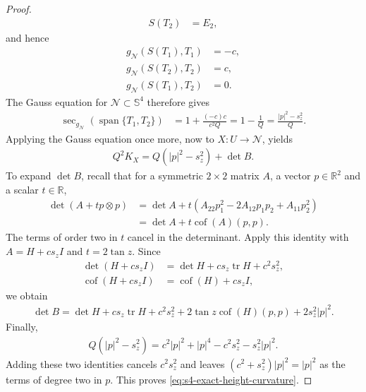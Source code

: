 \documentclass[a4paper,11pt,oneside,reqno]{amsart}
\numberwithin{equation}{section}
\theoremstyle{definition}
\begin{document}
\begin{proof}
\begin{align*}
        S(T_2)&=E_2,
    \end{align*}
    and hence
    \begin{align*}
        g_{\mathcal N}(S(T_1),T_1)&=-c,\\
        g_{\mathcal N}(S(T_2),T_2)&=c,\\
        g_{\mathcal N}(S(T_1),T_2)&=0.
    \end{align*}
    The Gauss equation for $\mathcal N\subset\mathbb S^4$
    therefore gives
    \begin{align*}
        \operatorname{sec}_{g_{\mathcal N}}
        (\operatorname{span}\{T_1,T_2\})
        &=1+\frac{(-c)c}{c^2Q}
        =1-\frac1Q
        =\frac{|p|^2-s_z^2}{Q}.
    \end{align*}
    Applying the Gauss equation once more, now to
    $X:U\to\mathcal N$, yields
    \begin{align*}
        Q^2K_X=Q(|p|^2-s_z^2)+\det B.
    \end{align*}
    To expand $\det B$, recall that for a symmetric
    $2\times2$ matrix $A$, a vector $p\in\mathbb R^2$
    and a scalar $t\in\mathbb R$,
    \begin{align*}
        \det(A+t p\otimes p)
        &=\det A+t(A_{22}p_1^2-2A_{12}p_1p_2+A_{11}p_2^2)\\
        &=\det A+t\operatorname{cof}(A)(p,p).
    \end{align*}
    The terms of order two in $t$ cancel in the
    determinant. Apply this identity with $A=H+c s_z I$
    and $t=2\tan z$. Since
    \begin{align*}
        \det(H+c s_z I)&=\det H+c s_z\operatorname{tr}H+c^2s_z^2,\\
        \operatorname{cof}(H+c s_z I)&=\operatorname{cof}(H)+c s_z I,
    \end{align*}
    we obtain
    \begin{align*}
        \det B
        =\det H+c s_z\operatorname{tr}H+c^2s_z^2
        +2\tan z\operatorname{cof}(H)(p,p)+2s_z^2|p|^2.
    \end{align*}
    Finally,
    \begin{align*}
        Q(|p|^2-s_z^2)
        =c^2|p|^2+|p|^4-c^2s_z^2-s_z^2|p|^2.
    \end{align*}
    Adding these two identities cancels $c^2s_z^2$ and
    leaves $(c^2+s_z^2)|p|^2=|p|^2$ as the terms of
    degree two in $p$. This proves
    \eqref{eq:s4-exact-height-curvature}.


\end{proof}
\end{document}
